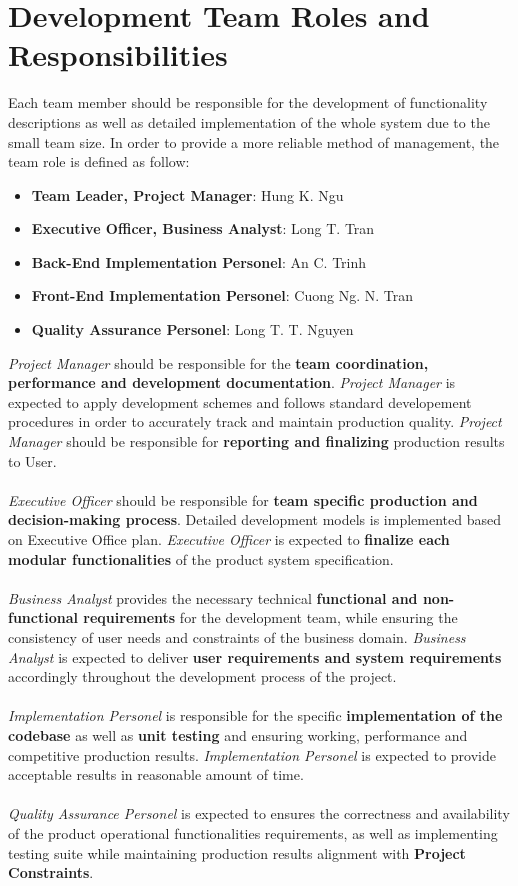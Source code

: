 \chapter{Development Team Roles and Responsibilities}
Each team member should be responsible for the development of functionality descriptions as well as detailed
implementation of the whole system due to the small team size.
In order to provide a more reliable method of man­age­ment, the team role is defined as follow:
\begin{itemize}
    \item \textbf{Team Leader, Project Manager}: Hung K. Ngu
    \item \textbf{Executive Officer, Business Analyst}: Long T. Tran
    \item \textbf{Back-End Implementation Personel}: An C. Trinh
    \item \textbf{Front-End Implementation Personel}: Cuong Ng. N. Tran
    \item \textbf{Quality Assurance Personel}: Long T. T. Nguyen
\end{itemize}

\textit{Project Manager} should be responsible for the \textbf{team coordination, performance and development documentation}. 
\textit{Project Manager} is expected to apply development schemes and follows standard developement procedures in order to accurately
track and maintain production quality.
\textit{Project Manager} should be responsible for \textbf{reporting and finalizing} production results to User.
\\\\
\textit{Executive Officer} should be responsible for \textbf{team specific production and decision-making process}. Detailed development models is implemented 
based on Executive Office plan.\textit{ Executive Officer} is expected to \textbf{finalize each modular functionalities} of the product system specification.
\\\\
\textit{Business Analyst} provides the necessary technical \textbf{functional and non-functional requirements} for the development team, while ensuring the consistency of user needs
and constraints of the business domain.\textit{ Business Analyst} is expected to deliver \textbf{user requirements and system requirements} accordingly throughout the development process
of the project.
\\\\
\textit{Implementation Personel} is responsible for the specific \textbf{implementation of the codebase} as well as \textbf{unit testing} and ensuring working, performance and
competitive production results.\textit{ Implementation Personel} is expected to provide acceptable results in reasonable amount of time.
\\\\
\textit{Quality Assurance Personel} is expected to ensures the correctness and availability of the product operational functionalities requirements, as well as 
implementing testing suite while maintaining production results alignment with \textbf{Project Constraints}.

